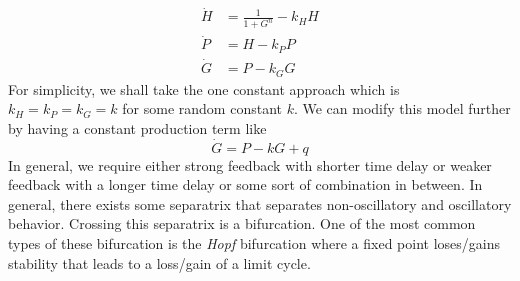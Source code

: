 \documentclass{article}
\begin{document}
\begin{equation*}
    \begin{split}
        \dot H &= \frac{1}{1+G^n} -k_H H \\
        \dot P &= H-k_PP\\
        \dot G &= P-k_GG
    \end{split}
\end{equation*}
For simplicity, we shall take the one constant approach which is $k_H=k_P=k_G=k$ for some random constant $k$. We can modify this model further by having a constant production term like 
\begin{equation*}
    \dot G = P-kG+q
\end{equation*}
In general, we require either strong feedback with shorter time delay or weaker feedback with a longer time delay or some sort of combination in between. In general, there exists some separatrix that separates non-oscillatory and oscillatory behavior. Crossing this separatrix is a bifurcation. One of the most common types of these bifurcation is the \emph{Hopf} bifurcation where a fixed point loses/gains stability that leads to a loss/gain of a limit cycle.
\end{document}
